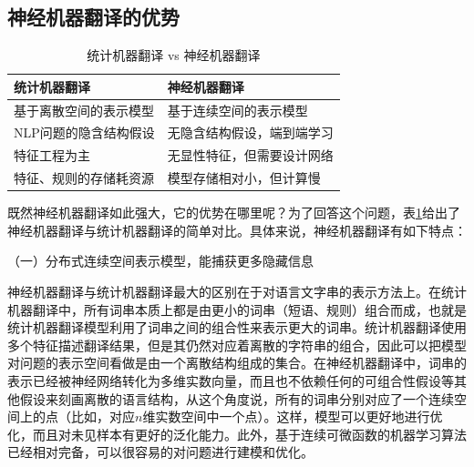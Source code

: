 
\subsection{神经机器翻译的优势 }

\vspace{1em}%
\begin{table}[htp]
\centering
\caption{统计机器翻译 vs 神经机器翻译}
\label{tab:6-4}
\begin{tabular}{ l | l }
  \rule{0pt}{15pt}  \parbox{12em}{统计机器翻译		}	&神经机器翻译\\ \hline
	  \rule{0pt}{13pt}  基于离散空间的表示模型			&基于连续空间的表示模型 \\
	  \rule{0pt}{13pt} NLP问题的隐含结构假设			&无隐含结构假设，端到端学习 \\
	  \rule{0pt}{13pt} 特征工程为主					&无显性特征，但需要设计网络 \\
	  \rule{0pt}{13pt} 特征、规则的存储耗资源			&模型存储相对小，但计算慢 \\
\end{tabular}
\end{table}

\parinterval  既然神经机器翻译如此强大，它的优势在哪里呢？为了回答这个问题，表\ref{tab:6-4}给出了神经机器翻译与统计机器翻译的简单对比。具体来说，神经机器翻译有如下特点：

\vspace{0.5em}
\parinterval  （一）分布式连续空间表示模型，能捕获更多隐藏信息

\parinterval  神经机器翻译与统计机器翻译最大的区别在于对语言文字串的表示方法上。在统计机器翻译中，所有词串本质上都是由更小的词串（短语、规则）组合而成，也就是统计机器翻译模型利用了词串之间的组合性来表示更大的词串。统计机器翻译使用多个特征描述翻译结果，但是其仍然对应着离散的字符串的组合，因此可以把模型对问题的表示空间看做是由一个离散结构组成的集合。在神经机器翻译中，词串的表示已经被神经网络转化为多维实数向量，而且也不依赖任何的可组合性假设等其他假设来刻画离散的语言结构，从这个角度说，所有的词串分别对应了一个连续空间上的点（比如，对应$n$维实数空间中一个点）。这样，模型可以更好地进行优化，而且对未见样本有更好的泛化能力。此外，基于连续可微函数的机器学习算法已经相对完备，可以很容易的对问题进行建模和优化。


